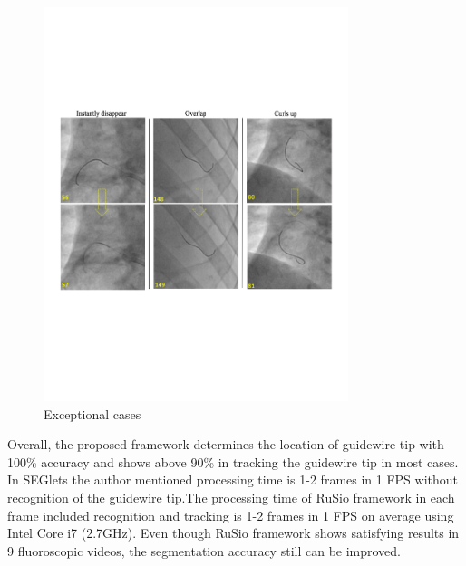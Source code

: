 \documentclass[journal]{IEEEtran}
\begin{document}
\begin{figure}[!htb]
	\centering  
	\includegraphics[width=3.5in]{figures/figure9}
		\caption{Exceptional cases} 
	\label{fig:mcmthesis-logo} 
\end{figure}




Overall, the proposed framework determines the location of guidewire tip with 100\% accuracy and shows above 90\% in tracking the guidewire tip in most cases. In SEGlets \cite{vandini2017robust} the author mentioned processing time is 1-2 frames in 1 FPS without recognition of the guidewire tip.The processing time of RuSio framework in each frame included recognition and tracking is 1-2 frames in 1 FPS on average using Intel Core i7 (2.7GHz). Even though RuSio framework shows satisfying results in 9 fluoroscopic videos, the segmentation accuracy still can be improved.
\end{document}
